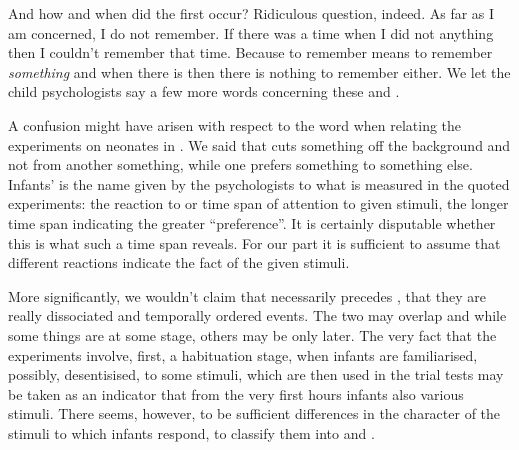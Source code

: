 And how and when did the first  occur? Ridiculous question,
indeed. As far as I am concerned, I do not remember. If there was a time when I
did not  anything then I couldn't remember that time. Because to
remember means to remember {\em something} and when there is  then
there is nothing to remember either. We let the child psychologists say a few
more words concerning these  and .

\pa A confusion might have arisen with respect to the word  when
relating the experiments on neonates in . We said that
 {cuts} something off the background and not from
another something, while one prefers something to something else. Infants'
 is the name given by the psychologists to what is measured in
the quoted experiments: the reaction to or time span of attention to given
stimuli, the longer time span indicating the greater ``preference''. It is
certainly disputable whether this is what such a time span reveals. For our part
it is sufficient to assume that different reactions indicate the fact of
 the given stimuli.

More significantly, we wouldn't claim that  necessarily
precedes , that they are really dissociated and temporally
ordered events. The two may overlap and while some things are  at
some stage, others may be  only later.  The very fact that the
experiments involve, first, a habituation stage, when infants are familiarised,
possibly, desentisised, to some stimuli, which are then used in the trial tests
may be taken as an indicator that from the very first hours infants also
 various stimuli. There seems, however, to be sufficient
differences in the character of the stimuli to which infants respond, to
classify them into  and .


